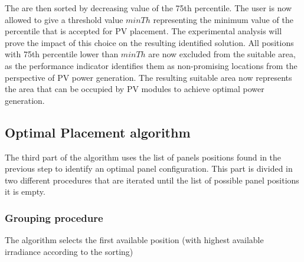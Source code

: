 The  are then sorted by decreasing value of the 75th percentile. The user is now allowed to give a threshold value $minTh$ representing the minimum value of the percentile that is accepted for PV placement. The experimental analysis will prove the impact of this choice on the resulting identified solution. All positions with 75th percentile lower than $minTh$ are now excluded from the suitable area, as the performance indicator identifies them as non-promising locations from the perspective of PV power generation. The resulting suitable area now represents the area that can be occupied by PV modules to achieve optimal power generation.  

\subsection{Optimal Placement algorithm }
\label{subsec:greedyplacement}
The third part of the algorithm uses the list of panels positions found in the previous step to identify an optimal panel configuration. This part is divided in two different procedures that are iterated until the list of possible panel positions it is empty.


\subsubsection{Grouping procedure}The algorithm selects the first available position (with highest available irradiance according to the sorting) 


